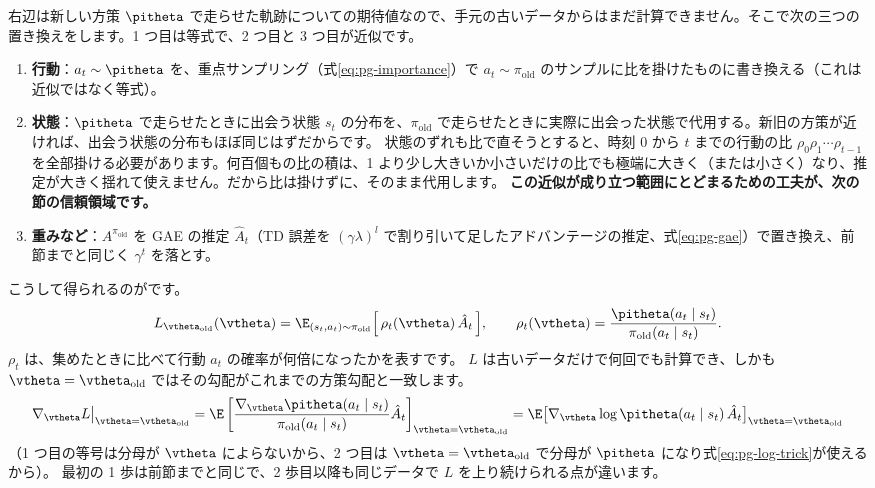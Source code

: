右辺は新しい方策 $\pitheta$ で走らせた軌跡についての期待値なので、手元の古いデータからはまだ計算できません。そこで次の三つの置き換えをします。1 つ目は等式で、2 つ目と 3 つ目が近似です。
\begin{enumerate}
\item \textbf{行動}：$a_t\sim\pitheta$ を、重点サンプリング（式\eqref{eq:pg-importance}）で $a_t\sim\pi_{\text{old}}$ のサンプルに比を掛けたものに書き換える（これは近似ではなく等式）。
\item \textbf{状態}：$\pitheta$ で走らせたときに出会う状態 $s_t$ の分布を、$\pi_{\text{old}}$ で走らせたときに実際に出会った状態で代用する。新旧の方策が近ければ、出会う状態の分布もほぼ同じはずだからです。
状態のずれも比で直そうとすると、時刻 $0$ から $t$ までの行動の比 $\rho_0\rho_1\cdots\rho_{t-1}$ を全部掛ける必要があります。何百個もの比の積は、1 より少し大きいか小さいだけの比でも極端に大きく（または小さく）なり、推定が大きく揺れて使えません。だから比は掛けずに、そのまま代用します。
\textbf{この近似が成り立つ範囲にとどまるための工夫が、次の節の信頼領域です。}
\item \textbf{重みなど}：$A^{\pi_{\text{old}}}$ を GAE の推定 $\hat{A}_t$（TD 誤差を $(\gamma\lambda)^l$ で割り引いて足したアドバンテージの推定、式\eqref{eq:pg-gae}）で置き換え、前節までと同じく $\gamma^t$ を落とす。
\end{enumerate}
こうして得られるのがです。
\begin{equation}
L_{\vtheta_{\text{old}}}(\vtheta)=\E_{(s_t,a_t)\sim\pi_{\text{old}}}\Bigl[\,\rho_t(\vtheta)\,\hat{A}_t\,\Bigr],\qquad
\rho_t(\vtheta)=\frac{\pitheta(a_t\mid s_t)}{\pi_{\text{old}}(a_t\mid s_t)} .
\label{eq:pg-surrogate}
\end{equation}
$\rho_t$ は、集めたときに比べて行動 $a_t$ の確率が何倍になったかを表すです。
$L$ は古いデータだけで何回でも計算でき、しかも $\vtheta=\vtheta_{\text{old}}$ ではその勾配がこれまでの方策勾配と一致します。
\[
\nabla_{\vtheta}L\big|_{\vtheta=\vtheta_{\text{old}}}
=\E\left[\frac{\nabla_{\vtheta}\pitheta(a_t\mid s_t)}{\pi_{\text{old}}(a_t\mid s_t)}\hat{A}_t\right]_{\vtheta=\vtheta_{\text{old}}}
=\E\bigl[\nabla_{\vtheta}\log\pitheta(a_t\mid s_t)\,\hat{A}_t\bigr]_{\vtheta=\vtheta_{\text{old}}}
\]
（1 つ目の等号は分母が $\vtheta$ によらないから、2 つ目は $\vtheta=\vtheta_{\text{old}}$ で分母が $\pitheta$ になり式\eqref{eq:pg-log-trick}が使えるから）。
最初の 1 歩は前節までと同じで、2 歩目以降も同じデータで $L$ を上り続けられる点が違います。

